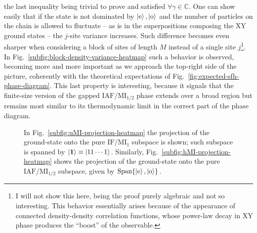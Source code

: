 the last inequality being trivial to prove and satisfied $\forall \gamma \in \mathbb{C}$. One can show easily that if the state is not dominated by $\ket{\mathrm{e}}, \ket{\mathrm{o}}$ and the number of particles on the chain is allowed to fluctuate -- as is in the superpositions composing the $\mathrm{XY}$ ground states -- the $j$-site variance increases. Such difference becomes even sharper when considering a block of sites of length $M$ instead of a single site $j$\footnote{
	I will not show this here, being the proof purely algebraic and not so interesting. This behavior essentially arises because of the appearance of connected density-density correlation functions, whose power-law decay in $\mathrm{XY}$ phase produces the ``boost'' of the observable.
}. In Fig.~\ref{subfig:block-density-variance-heatmap} such a behavior is observed, becoming more and more important as we approach the top-right side of the picture, coherently with the theoretical expectations of Fig.~\ref{fig:expected-sfh-phase-diagram}. This last property is interesting, because it signals that the finite-size version of the gapped $\mathrm{IAF}/\mathrm{MI}_{1/2}$ phase extends over a broad region but remains most similar to its thermodynamic limit in the correct part of the phase diagram.
	
\begin{figure}
	\centering	
	\caption{In Fig.~\ref{subfig:uMI-projection-heatmap} the projection of the ground-state onto the pure $\mathrm{IF}/\mathrm{MI}_1$ subspace is shown; such subspace is spanned by $\ket{\bm{1}} \equiv \ket{11\cdots1}$. Similarly, Fig.~\ref{subfig:hMI-projection-heatmap} shows the projection of the ground-state onto the pure $\mathrm{IAF}/\mathrm{MI}_{1/2}$ subspace, given by $\mathrm{Span}\lbrace \ket{\mathrm{e}}, \ket{\mathrm{o}} \rbrace$.}
\end{figure}

